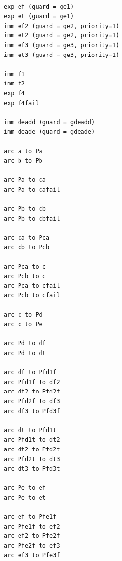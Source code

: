 \begin{figure}[ht]
\begin{small}
\begin{verbatim}

exp ef (guard = ge1)
exp et (guard = ge1)
imm ef2 (guard = ge2, priority=1)
imm et2 (guard = ge2, priority=1)
imm ef3 (guard = ge3, priority=1)
imm et3 (guard = ge3, priority=1)

imm f1
imm f2
exp f4
exp f4fail

imm deadd (guard = gdeadd)
imm deade (guard = gdeade)

arc a to Pa
arc b to Pb

arc Pa to ca
arc Pa to cafail

arc Pb to cb
arc Pb to cbfail

arc ca to Pca
arc cb to Pcb

arc Pca to c
arc Pcb to c
arc Pca to cfail
arc Pcb to cfail

arc c to Pd
arc c to Pe

arc Pd to df
arc Pd to dt

arc df to Pfd1f
arc Pfd1f to df2
arc df2 to Pfd2f
arc Pfd2f to df3
arc df3 to Pfd3f

arc dt to Pfd1t
arc Pfd1t to dt2
arc dt2 to Pfd2t
arc Pfd2t to dt3
arc dt3 to Pfd3t

arc Pe to ef
arc Pe to et

arc ef to Pfe1f
arc Pfe1f to ef2
arc ef2 to Pfe2f
arc Pfe2f to ef3
arc ef3 to Pfe3f
\end{verbatim}
\end{small}
\end{figure}

